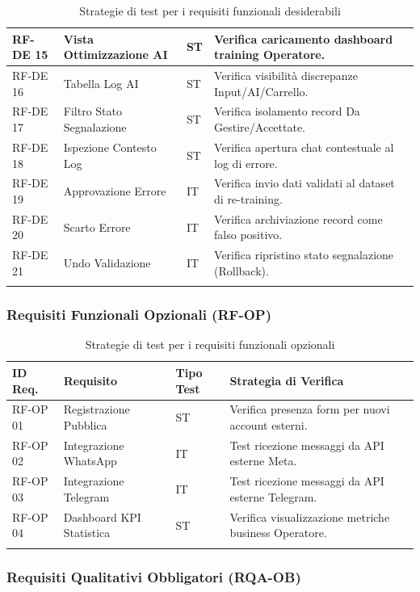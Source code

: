 \documentclass[a4paper,11pt,oneside]{scrartcl}
\begin{document}
\begin{longtable}{|p{1.5cm}|p{5.5cm}|p{1.8cm}|p{5cm}|}
RF-DE 15 & Vista Ottimizzazione AI & ST & Verifica caricamento dashboard training Operatore. \\ \hline
RF-DE 16 & Tabella Log AI & ST & Verifica visibilità discrepanze Input/AI/Carrello. \\ \hline
RF-DE 17 & Filtro Stato Segnalazione & ST & Verifica isolamento record Da Gestire/Accettate. \\ \hline
RF-DE 18 & Ispezione Contesto Log & ST & Verifica apertura chat contestuale al log di errore. \\ \hline
RF-DE 19 & Approvazione Errore & IT & Verifica invio dati validati al dataset di re-training. \\ \hline
RF-DE 20 & Scarto Errore & IT & Verifica archiviazione record come falso positivo. \\ \hline
RF-DE 21 & Undo Validazione & IT & Verifica ripristino stato segnalazione (Rollback). \\ \hline
\caption{Strategie di test per i requisiti funzionali desiderabili}
\end{longtable}

\newpage
\subsubsection{Requisiti Funzionali Opzionali (RF-OP)}

\begin{longtable}{|p{1.5cm}|p{5.5cm}|p{1.8cm}|p{5cm}|}
\hline
\textbf{ID Req.} & \textbf{Requisito} & \textbf{Tipo Test} & \textbf{Strategia di Verifica} \\
\hline
RF-OP 01 & Registrazione Pubblica & ST & Verifica presenza form per nuovi account esterni. \\ \hline
RF-OP 02 & Integrazione WhatsApp & IT & Test ricezione messaggi da API esterne Meta. \\ \hline
RF-OP 03 & Integrazione Telegram & IT & Test ricezione messaggi da API esterne Telegram. \\ \hline
RF-OP 04 & Dashboard KPI Statistica & ST & Verifica visualizzazione metriche business Operatore. \\ \hline
\caption{Strategie di test per i requisiti funzionali opzionali}
\end{longtable}

\newpage
\subsubsection{Requisiti Qualitativi Obbligatori (RQA-OB)}
\end{document}
